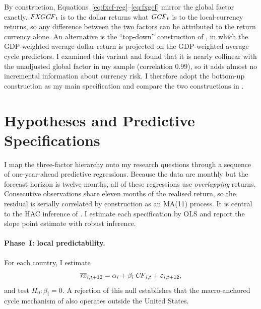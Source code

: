 By construction,
Equations~\eqref{eq:fxcf-reg}--\eqref{eq:fxgcf} mirror the global
factor exactly. $\mathit{FXGCF}_{t}$ is to the dollar returns what $\mathit{GCF}_{t}$ is to
the local-currency returns, so any difference between the two factors can be
attributed to the return currency alone. An alternative is the
``top-down'' construction of \citet{dahlquist2013}, in which the GDP-weighted
average dollar return is projected on the GDP-weighted average cycle
predictors. I examined this variant and found that it is nearly collinear
with the unadjusted global factor in my sample (correlation $0.99$), so it
adds almost no incremental information about currency risk. I therefore
adopt the bottom-up construction as my main specification and compare the
two constructions in .

\section{Hypotheses and Predictive Specifications}
\label{sec:fw-hypotheses}

I map the three-factor hierarchy onto my research questions through a
sequence of one-year-ahead predictive regressions. Because the data are monthly
but the forecast horizon is twelve months, all of these regressions use
\emph{overlapping} returns. Consecutive observations share eleven months of the
realised return, so the residual is serially correlated by construction as an
MA(11) process. It is central to the HAC inference of . I estimate each specification
by OLS and report the slope point estimate with robust inference.

\paragraph{Phase~I: local predictability.}
For each country, I estimate
\begin{equation}
  \overline{\mathit{rx}}_{i,t+12} = \alpha_{i} + \beta_{i}\,\mathit{CF}_{i,t} + \varepsilon_{i,t+12},
  \label{eq:h-local}
\end{equation}
and test $H_{0}\!:\beta_{i}=0$. A rejection of this null establishes that the
macro-anchored cycle mechanism of \citet{cieslak2015} also operates outside the
United States.

